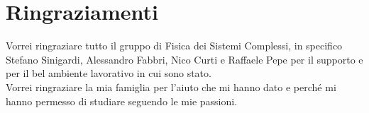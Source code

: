 
\chapter*{Ringraziamenti}
\begin{SingleSpace}
Vorrei ringraziare tutto il gruppo di Fisica dei Sistemi Complessi, in specifico Stefano Sinigardi, Alessandro Fabbri, Nico Curti e Raffaele Pepe per il supporto e per il bel ambiente lavorativo in cui sono stato. \\
Vorrei ringraziare la mia famiglia per l'aiuto che mi hanno dato e perché mi hanno permesso di studiare seguendo le mie passioni.
\end{SingleSpace}
\clearpage
